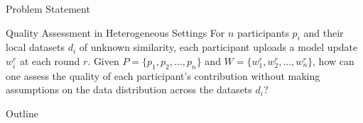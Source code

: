 \begin{frame}{Problem Statement}
  \begin{block}{Quality Assessment in Heterogeneous Settings}
    For $n$ participants $p_i$ and their local datasets $d_i$ of unknown similarity, each participant uploads a model update $w_i^r$ at each round $r$. Given $P = \{ p_1, p_2, \dots, p_n \} $ and $W = \{ w_1^r, w_2^r, \dots, w_n^r \} $, how can one assess the quality of each participant’s contribution without making assumptions on the data distribution across the datasets $d_i$?
  \end{block}
\end{frame}

\begin{frame}{Outline}
  \centering
  \begin{minipage}[t]{.8\textwidth}
    \tableofcontents%
  \end{minipage}
\end{frame}


